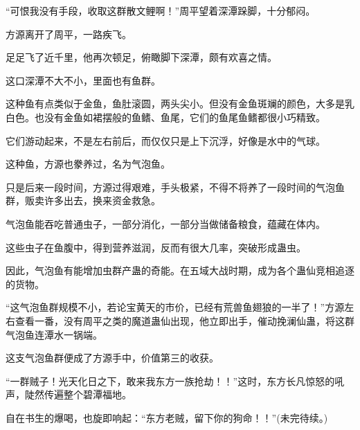 \begin{this_body}
“可恨我没有手段，收取这群散文鲤啊！”周平望着深潭跺脚，十分郁闷。

方源离开了周平，一路疾飞。

足足飞了近千里，他再次顿足，俯瞰脚下深潭，颇有欢喜之情。

这口深潭不大不小，里面也有鱼群。

这种鱼有点类似于金鱼，鱼肚滚圆，两头尖小。但没有金鱼斑斓的颜色，大多是乳白色。也没有金鱼如裙摆般的鱼鳍、鱼尾，它们的鱼尾鱼鳍都很小巧精致。

它们游动起来，不是左右前后，而仅仅只是上下沉浮，好像是水中的气球。

这种鱼，方源也豢养过，名为气泡鱼。

只是后来一段时间，方源过得艰难，手头极紧，不得不将养了一段时间的气泡鱼群，贩卖许多出去，换来资金救急。

气泡鱼能吞吃普通虫子，一部分消化，一部分当做储备粮食，蕴藏在体内。

这些虫子在鱼腹中，得到营养滋润，反而有很大几率，突破形成蛊虫。

因此，气泡鱼有能增加虫群产蛊的奇能。在五域大战时期，成为各个蛊仙竞相追逐的货物。

“这气泡鱼群规模不小，若论宝黄天的市价，已经有荒兽鱼翅狼的一半了！”方源左右查看一番，没有周平之类的魔道蛊仙出现，他立即出手，催动挽澜仙蛊，将这群气泡鱼连潭水一锅端。

这支气泡鱼群便成了方源手中，价值第三的收获。

“一群贼子！光天化日之下，敢来我东方一族抢劫！！”这时，东方长凡惊怒的吼声，陡然传遍整个碧潭福地。

自在书生的爆喝，也旋即响起：“东方老贼，留下你的狗命！！”(未完待续。)

\end{this_body}

